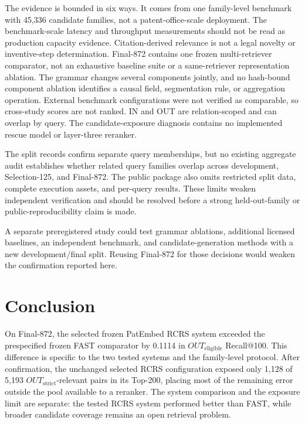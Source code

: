 \documentclass[final,5p,times,twocolumn]{elsarticle}
\begin{document}
The evidence is bounded in six ways. It comes from one family-level benchmark
with 45,336 candidate families, not a patent-office-scale deployment. The
benchmark-scale latency and throughput measurements should not be read as
production capacity evidence. Citation-derived relevance is not a legal
novelty or inventive-step determination.
Final-872 contains one frozen multi-retriever comparator, not an exhaustive
baseline suite or a same-retriever representation ablation. The
grammar changes several components jointly, and no hash-bound component
ablation identifies a causal field, segmentation rule, or aggregation
operation. External benchmark configurations were not verified as comparable,
so cross-study scores are not ranked. IN and OUT are relation-scoped and can
overlap by query. The candidate-exposure diagnosis contains no implemented
rescue model or layer-three
reranker.

The split records confirm separate query memberships, but no existing
aggregate audit establishes whether related query families overlap across
development, Selection-125, and Final-872. The public package also omits
restricted split data, complete execution assets, and per-query results.
These limits weaken independent verification and should be resolved before a
strong held-out-family or public-reproducibility claim is made.

A separate preregistered study could test grammar ablations, additional licensed
baselines, an independent benchmark, and candidate-generation methods with a
new development/final split. Reusing Final-872 for those decisions would weaken the
confirmation reported here.

\section{Conclusion}

On Final-872, the selected frozen PatEmbed RCRS system exceeded the
prespecified frozen FAST comparator by 0.1114 in
\(OUT_{\mathrm{eligible}}\) Recall@100. This difference is specific to the two
tested systems and the family-level protocol. After confirmation,
the unchanged selected RCRS configuration exposed only 1,128 of 5,193
\(OUT_{\mathrm{strict}}\)-relevant pairs in
its Top-200, placing most of the remaining error outside the pool available to
a reranker. The system comparison and the exposure limit are separate: the
tested RCRS system performed better than FAST, while broader candidate
coverage remains an open retrieval problem.
\end{document}
